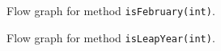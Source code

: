 \documentclass[a4paper]{article}
\begin{document}
\begin{figure}[htpb!]
    \begin{center}
        \caption{Flow graph for method \texttt{isFebruary(int)}.}
        \label{figure:february}
    \end{center}
\end{figure}

\begin{figure}[htpb!]
    \begin{center}
        \caption{Flow graph for method \texttt{isLeapYear(int)}.}
        \label{figure:leap-year}
    \end{center}
\end{figure}
\end{document}
